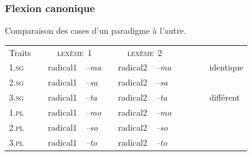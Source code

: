 \begin{frame}
\frametitle{Flexion canonique}
Comparaison des cases d'un paradigme à l'autre.

\scriptsize

\begin{table}
\begin{tabular}{|l| p{1mm}|ll|p{1mm}|ll|p{1mm}cl}
\cline{1-1}\cline{3-4}\cline{6-7}
Traits&&\multicolumn{2}{|c|}{\cellcolor{white}\textsc{ lexème~1}}&&\multicolumn{2}{|c|}{\cellcolor{white}\textsc{ lexème~2}}&&\\
\cline{1-1}\cline{3-4}\cline{6-7}
\textsc{1.sg}&& radical1& {\em --ma}&&radical2& {\em
  --ma}&&\cellcolor{ciel}~~~&identique\\
\cline{1-1}\cline{3-4}\cline{6-7}
\textsc{2.sg}& &radical1&{\em --sa}&&radical2& {\em --sa}&&&\\
\cline{1-1}\cline{3-4}\cline{6-7}

\textsc{3.sg}&& radical1&{\em --ta}&&radical2& {\em
  --ta}&&\cellcolor{mandarine}&différent\\
\cline{1-1}\cline{3-4}\cline{6-7}
\textsc{1.pl}&&radical1& {\em --mo}&&radical2& {\em --mo}&&\\
\cline{1-1}\cline{3-4}\cline{6-7}
\textsc{2.pl}&&radical1& {\em --so}&&radical2& {\em --so}&&\\
\cline{1-1}\cline{3-4}\cline{6-7}
\textsc{3.pl}&&radical1& {\em --to}&&radical2& {\em --to}&&\\
\cline{1-1}\cline{3-4}\cline{6-7}
\end{tabular}\\[1mm]
\end{table}
\end{frame}

